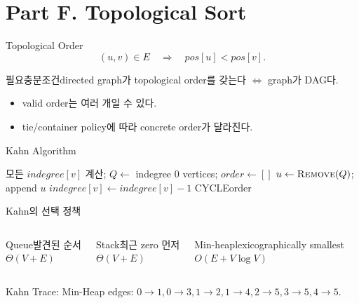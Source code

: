 \section{Part F. Topological Sort}
\begin{frame}{Topological Order}
\[
(u,v)\in E\quad\Longrightarrow\quad pos[u]<pos[v].
\]
\begin{block}{필요충분조건}directed graph가 topological order를 갖는다 \(\Longleftrightarrow\) graph가 DAG다.\end{block}
\begin{itemize}\item valid order는 여러 개일 수 있다.\item tie/container policy에 따라 concrete order가 달라진다.\end{itemize}
\end{frame}
\begin{frame}{Kahn Algorithm}
\algofont\begin{algorithmic}[1]
\State 모든 \(indegree[v]\) 계산; \(Q\gets\) indegree 0 vertices; \(order\gets[]\)
\State \(u\gets\Call{Remove}{Q}\); append \(u\)
\State \(indegree[v]\gets indegree[v]-1\)
\State {}\EndIf\EndFor\EndWhile
{}\State\Return CYCLE\EndIf\State\Return order\EndProcedure
\end{algorithmic}
\end{frame}
\begin{frame}{Kahn의 선택 정책}
\begin{columns}[T]\begin{block}{Queue}발견된 순서\\\(\Theta(V+E)\)\end{block}
\begin{block}{Stack}최근 zero 먼저\\\(\Theta(V+E)\)\end{block}
\begin{block}{Min-heap}lexicographically smallest\\\(O(E+V\log V)\)\end{block}\end{columns}
\end{frame}
\begin{frame}{Kahn Trace: Min-Heap}
\small edges: \(0\to1,0\to3,1\to2,1\to4,2\to5,3\to5,4\to5\).
\centering{}
\end{frame}

